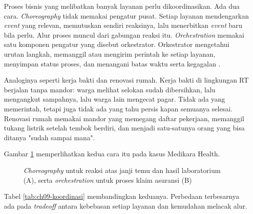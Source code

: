 Proses bisnis yang melibatkan banyak layanan perlu dikoordinasikan. Ada dua cara.
\textit{Choreography} tidak memakai pengatur pusat. Setiap layanan mendengarkan \textit{event} yang
relevan, memutuskan sendiri reaksinya, lalu menerbitkan \textit{event} baru bila perlu. Alur proses
muncul dari gabungan reaksi itu. \textit{Orchestration} memakai satu komponen pengatur yang disebut
orkestrator. Orkestrator mengetahui urutan langkah, memanggil atau mengirim perintah ke setiap
layanan, menyimpan status proses, dan menangani batas waktu serta kegagalan
\cite{newman2021,richardson2018}.

Analoginya seperti kerja bakti dan renovasi rumah. Kerja bakti di lingkungan RT berjalan tanpa
mandor: warga melihat selokan sudah dibersihkan, lalu mengangkut sampahnya, lalu warga lain mengecat
pagar. Tidak ada yang memerintah, tetapi juga tidak ada yang tahu persis kapan semuanya selesai.
Renovasi rumah memakai mandor yang memegang daftar pekerjaan, memanggil tukang listrik setelah
tembok berdiri, dan menjadi satu-satunya orang yang bisa ditanya "sudah sampai mana".

Gambar \ref{fig:ch09-koreografi-orkestrasi} memperlihatkan kedua cara itu pada kasus Medikara Health.

\begin{figure}[!htb]
  \centering
  
  \caption{\textit{Choreography} untuk reaksi atas janji temu dan hasil laboratorium (A), serta
           \textit{orchestration} untuk proses klaim asuransi (B)}
  \label{fig:ch09-koreografi-orkestrasi}
\end{figure}

Tabel \ref{tab:ch09-koordinasi} membandingkan keduanya. Perbedaan terbesarnya ada pada
\textit{tradeoff} antara kebebasan setiap layanan dan kemudahan melacak alur.

